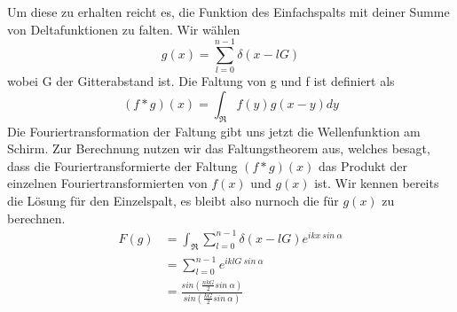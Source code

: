 \documentclass[]{article}
\begin{document}
Um diese zu erhalten reicht es, die Funktion des Einfachspalts mit deiner Summe von Deltafunktionen zu falten. Wir wählen
\begin{equation}
	g(x)=\sum_{l=0}^{n-1}\delta(x-lG)
\end{equation}
wobei G der Gitterabstand ist. Die Faltung von g und f ist definiert als
\begin{equation}
	(f*g)(x)=\int_{\Re} f(y)g(x-y)dy
\end{equation}
Die Fouriertransformation der Faltung gibt uns jetzt die Wellenfunktion am Schirm. Zur Berechnung nutzen wir das Faltungstheorem aus, welches besagt, dass die Fouriertransformierte der Faltung $(f*g)(x)$ das Produkt der einzelnen Fouriertransformierten von $ f(x) $ und $ g(x) $ ist. Wir kennen bereits die Lösung für den Einzelspalt, es bleibt also nurnoch die für $g(x)$ zu berechnen.
\begin{align}
	\textit{F}(g)&=\int_{\Re}\sum_{l=0}^{n-1}\delta(x-lG)e^{ikx \ sin \ \alpha}\\
				&=\sum_{l=0}^{n-1}e^{iklG \ sin \ \alpha}\\
				&=\frac{sin(\frac{nkG}{2}sin \ \alpha)}{sin(\frac{kG}{2}sin \ \alpha)}
\end{align}
\end{document}
